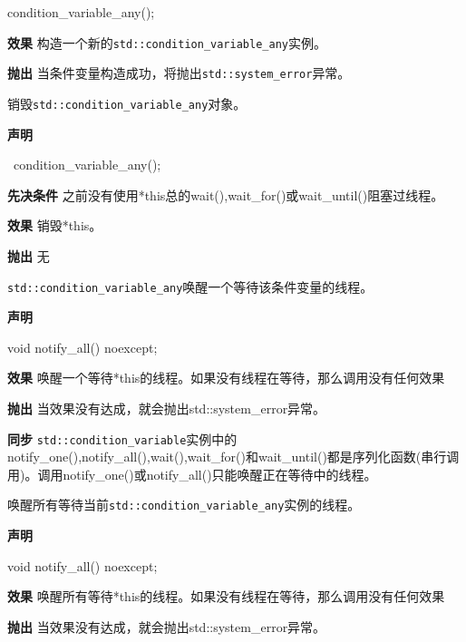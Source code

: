 \begin{cpp}
condition_variable_any();
\end{cpp}

\textbf{效果}
构造一个新的\texttt{std::condition\_variable\_any}实例。

\textbf{抛出}
当条件变量构造成功，将抛出\texttt{std::system\_error}异常。


销毁\texttt{std::condition\_variable\_any}对象。

\textbf{声明}

\begin{cpp}
~condition_variable_any();
\end{cpp}

\textbf{先决条件}
之前没有使用*this总的wait(),wait\_for()或wait\_until()阻塞过线程。

\textbf{效果}
销毁*this。

\textbf{抛出}
无


\texttt{std::condition\_variable\_any}唤醒一个等待该条件变量的线程。

\textbf{声明}

\begin{cpp}
void notify_all() noexcept;
\end{cpp}

\textbf{效果}
唤醒一个等待*this的线程。如果没有线程在等待，那么调用没有任何效果

\textbf{抛出}
当效果没有达成，就会抛出std::system\_error异常。

\textbf{同步}
\texttt{std::condition\_variable}实例中的notify\_one(),notify\_all(),wait(),wait\_for()和wait\_until()都是序列化函数(串行调用)。调用notify\_one()或notify\_all()只能唤醒正在等待中的线程。


唤醒所有等待当前\texttt{std::condition\_variable\_any}实例的线程。

\textbf{声明}

\begin{cpp}
void notify_all() noexcept;
\end{cpp}

\textbf{效果}
唤醒所有等待*this的线程。如果没有线程在等待，那么调用没有任何效果

\textbf{抛出}
当效果没有达成，就会抛出std::system\_error异常。

